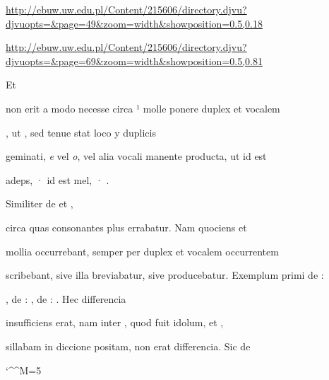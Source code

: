 
\newParkoszpage


{
\url{http://ebuw.uw.edu.pl/Content/215606/directory.djvu?djvuopts=&page=49&zoom=width&showposition=0.5,0.18}

\url{http://ebuw.uw.edu.pl/Content/215606/directory.djvu?djvuopts=&page=69&zoom=width&showposition=0.5,0.81}
}


\fullpreviouslines


{
\color{blue}
Et

}


\fulllines
{}
non erit a modo necesse circa ¹ molle ponere duplex  et vocalem 

, ut  , sed  tenue stat loco y duplicis

geminati, \textit{e} vel \textit{o}, vel alia vocali manente producta, ut  id est

\splitlines
adeps, ·  id est mel, · .

\indentK Similiter de  et ,

\fulllines
circa quas consonantes plus errabatur. Nam quociens  et 

mollia occurrebant, semper per duplex  et vocalem occurrentem

scribebant, sive illa breviabatur, sive producebatur. Exemplum primi de :

, de : , de : . Hec differencia

insufficiens erat, nam inter , quod fuit idolum, et ,

sillabam in diccione  positam, non erat differencia. Sic de

\catcode `\^^M=5


\obeylines

